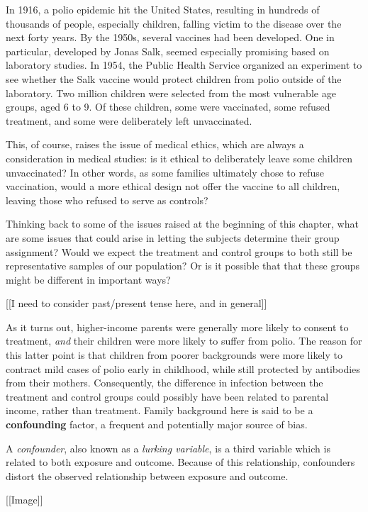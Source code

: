 \documentclass[
]{book}
\theoremstyle{definition}
\theoremstyle{definition}
\theoremstyle{definition}
\theoremstyle{remark}
\begin{document}
In 1916, a polio epidemic hit the United States, resulting in hundreds of thousands of people, especially children, falling victim to the disease over the next forty years. By the 1950s, several vaccines had been developed. One in particular, developed by Jonas Salk, seemed especially promising based on laboratory studies. In 1954, the Public Health Service organized an experiment to see whether the Salk vaccine would protect children from polio outside of the laboratory. Two million children were selected from the most vulnerable age groups, aged 6 to 9. Of these children, some were vaccinated, some refused treatment, and some were deliberately left unvaccinated.

This, of course, raises the issue of medical ethics, which are always a consideration in medical studies: is it ethical to deliberately leave some children unvaccinated? In other words, as some families ultimately chose to refuse vaccination, would a more ethical design not offer the vaccine to all children, leaving those who refused to serve as controls?

Thinking back to some of the issues raised at the beginning of this chapter, what are some issues that could arise in letting the subjects determine their group assignment? Would we expect the treatment and control groups to both still be representative samples of our population? Or is it possible that that these groups might be different in important ways?

{[}{[}I need to consider past/present tense here, and in general{]}{]}

As it turns out, higher-income parents were generally more likely to consent to treatment, \emph{and} their children were more likely to suffer from polio. The reason for this latter point is that children from poorer backgrounds were more likely to contract mild cases of polio early in childhood, while still protected by antibodies from their mothers. Consequently, the difference in infection between the treatment and control groups could possibly have been related to parental income, rather than treatment. Family background here is said to be a \textbf{confounding} factor, a frequent and potentially major source of bias.

A \emph{confounder}, also known as a \emph{lurking variable}, is a third variable which is related to both exposure and outcome. Because of this relationship, confounders distort the observed relationship between exposure and outcome.

{[}{[}Image{]}{]}
\end{document}
